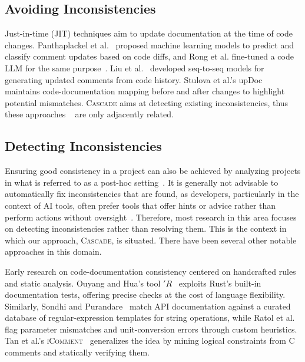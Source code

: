 \documentclass[acmsmall, screen]{acmart}
\newcommand{\tool}{\textsc{Cascade}\xspace}
\begin{document}
\subsection{Avoiding Inconsistencies}
Just-in-time (JIT) techniques aim to update documentation at the time of code changes. Panthaplackel et al.~\cite{panthaplackel2020learning, panthaplackel2021deep} proposed machine learning models to predict and classify comment updates based on code diffs, and Rong et al. fine-tuned a code LLM for the same purpose~\cite{carlama}. Liu et al.~\cite{liu2020automating, liu2021just} developed seq-to-seq models for generating updated comments from code history. Stulova et al.'s upDoc~\cite{upDoc} maintains code-documentation mapping before and after changes to highlight potential mismatches. \tool aims at detecting existing inconsistencies, thus these approaches ~\cite{panthaplackel2020learning, panthaplackel2021deep,liu2020automating, liu2021just,upDoc} are only adjacently related.


\subsection{Detecting Inconsistencies}
Ensuring good consistency in a project can also be achieved by analyzing projects in what is referred to as a post-hoc setting~\cite{panthaplackel2021deep}. It is generally not advisable to automatically fix inconsistencies that are found, as developers, particularly in the context of AI tools, often prefer tools that offer hints or advice rather than perform actions without oversight~\cite{developersWant}. Therefore, most research in this area focuses on detecting inconsistencies rather than resolving them. This is the context in which our approach, \tool, is situated. There have been several other notable approaches in this domain. 

Early research on code-documentation consistency centered on handcrafted rules and static analysis.  
Ouyang and Hua's tool $'R$~\cite{inconR} exploits Rust's built-in documentation tests, offering precise checks at the cost of language flexibility.  
Similarly, Sondhi and Purandare~\cite{sondhi2019segate} match API documentation against a curated database of regular-expression templates for string operations, while Ratol et al.~\cite{ratol2017detecting} flag parameter mismatches and unit-conversion errors through custom heuristics.  
Tan et al.'s \textsc{iComment}~\cite{tan2007icomment} generalizes the idea by mining logical constraints from C comments and statically verifying them.
\end{document}
